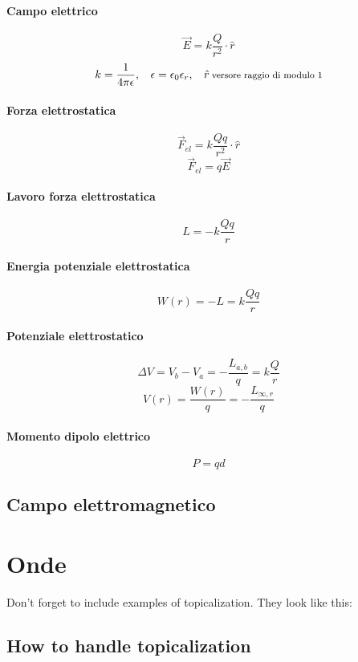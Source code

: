 \documentclass[12pt]{article}
\begin{document}
    \paragraph*{Campo elettrico}
    \[\vec{E} = k \frac{Q}{r^2} \cdot \hat{r}\]
    \[k = \frac{1}{4\pi\epsilon}, \:\:\:\: \epsilon = \epsilon_0\epsilon_r, \:\:\:\: \hat{r} \:\text{\footnotesize{versore raggio di modulo 1}}\]
    \paragraph*{Forza elettrostatica}
    \[\vec{F}_{el} = k \frac{Q q}{r^2} \cdot \hat{r}\]
    \[\vec{F}_{el} = q\vec{E}\]
    \paragraph*{Lavoro forza elettrostatica}
    \[L = -k \frac{Q q}{r} \]
    \paragraph*{Energia potenziale elettrostatica}
    \[W(r) =-L= k \frac{Q q}{r} \]
    \paragraph*{Potenziale elettrostatico}
    \[\Delta V = V_b - V_a = -\frac{L_{a,b}}{q} = k\frac{Q}{r}\]
    \[V(r) = \frac{W(r)}{q} = - \frac{L_{\infty, r}}{q}\]
    \paragraph*{Momento dipolo elettrico}
    \[P = qd\]
    \subsection{Campo elettromagnetico}
\section{Onde}

Don't forget to include examples of topicalization.
They look like this:

{\small
{}
}

\subsection*{How to handle topicalization}
\end{document}
